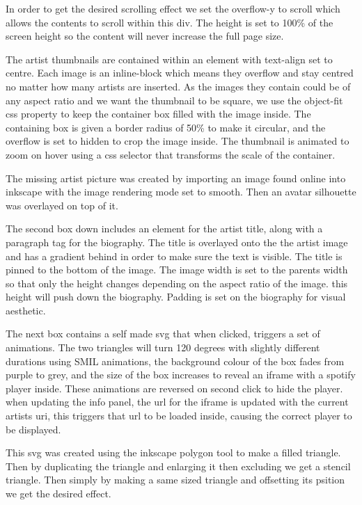 \documentclass[10pt]{article}
\begin{document}
                In order to get the desired scrolling effect we set the overflow-y to scroll which allows the contents to scroll within this div. The height is set to 100\% of the screen height so the content will never increase the full page size.

                The artist thumbnails are contained within an element with text-align set to centre. Each image is an inline-block which means they overflow and stay centred no matter how many artists are inserted. As the images they contain could be of any aspect ratio and we want the thumbnail to be square, we use the object-fit css property to keep the container box filled with the image inside. The containing box is given a border radius of 50\% to make it circular, and the overflow is set to hidden to crop the image inside. The thumbnail is animated to zoom on hover using a css selector that transforms the scale of the container.

                The missing artist picture was created by importing an image found online into inkscape with the image rendering mode set to smooth. Then an avatar silhouette was overlayed on top of it.

                The second box down includes an element for the artist title, along with a paragraph tag for the biography. The title is overlayed onto the the artist image and has a gradient behind in order to make sure the text is visible. The title is pinned to the bottom of the image. The image width is set to the parents width so that only the height changes depending on the aspect ratio of the image. this height will push down the biography. Padding is set on the biography for visual aesthetic.

                The next box contains a self made svg that when clicked, triggers a set of animations. The two triangles will turn 120 degrees with slightly different durations using SMIL animations, the background colour of the box fades from purple to grey, and the size of the box increases to reveal an iframe with a spotify player inside. These animations are reversed on second click to hide the player. when updating the info panel, the url for the iframe is updated with the current artists uri, this triggers that url to be loaded inside, causing the correct player to be displayed.

                This svg was created using the inkscape polygon tool to make a filled triangle. Then by duplicating the triangle and enlarging it then excluding we get a stencil triangle. Then simply by making a same sized triangle and offsetting its psition we get the desired effect.
\end{document}
